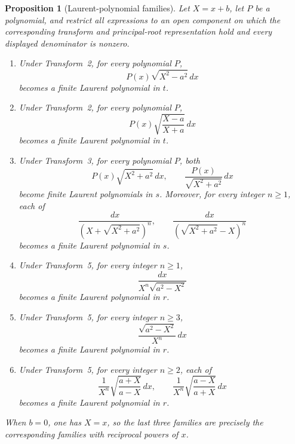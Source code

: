 \documentclass[11pt]{article}
\newtheorem{proposition}[theorem]{Proposition}
\theoremstyle{remark}
\begin{document}
\begin{proposition}[Laurent-polynomial families]
\label{prop:laurent}
Let $X=x+b$, let $P$ be a polynomial, and restrict all expressions to an open component on which the corresponding transform and principal-root representation hold and every displayed denominator is nonzero.
\begin{enumerate}[label=\arabic*.]
\item Under Transform~2, for every polynomial $P$,
\[
P(x)\sqrt{X^2-a^2}\,dx
\]
becomes a finite Laurent polynomial in $t$.
\item Under Transform~2, for every polynomial $P$,
\[
P(x)\sqrt{\frac{X-a}{X+a}}\,dx
\]
becomes a finite Laurent polynomial in $t$.
\item Under Transform~3, for every polynomial $P$, both
\[
P(x)\sqrt{X^2+a^2}\,dx,
\qquad
\frac{P(x)}{\sqrt{X^2+a^2}}\,dx
\]
become finite Laurent polynomials in $s$. Moreover, for every integer $n\ge1$, each of
\[
\frac{dx}{\left(X+\sqrt{X^2+a^2}\right)^n},
\qquad
\frac{dx}{\left(\sqrt{X^2+a^2}-X\right)^n}
\]
becomes a finite Laurent polynomial in $s$.
\item Under Transform~5, for every integer $n\ge1$,
\[
\frac{dx}{X^n\sqrt{a^2-X^2}}
\]
becomes a finite Laurent polynomial in $r$.
\item Under Transform~5, for every integer $n\ge3$,
\[
\frac{\sqrt{a^2-X^2}}{X^n}\,dx
\]
becomes a finite Laurent polynomial in $r$.
\item Under Transform~5, for every integer $n\ge2$, each of
\[
\frac{1}{X^n}\sqrt{\frac{a+X}{a-X}}\,dx,
\qquad
\frac{1}{X^n}\sqrt{\frac{a-X}{a+X}}\,dx
\]
becomes a finite Laurent polynomial in $r$.
\end{enumerate}
When $b=0$, one has $X=x$, so the last three families are precisely the corresponding families with reciprocal powers of $x$.
\end{proposition}
\end{document}
